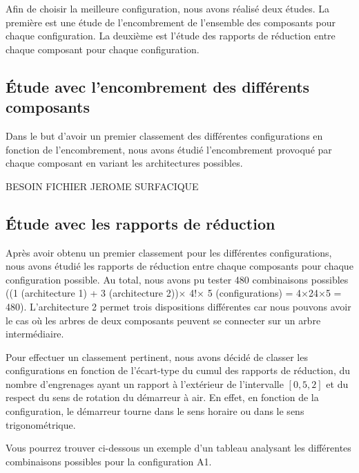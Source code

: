 \documentclass{config}
\begin{document}
\begin{spacing}{1.2}
Afin de choisir la meilleure configuration, nous avons réalisé deux études. La première est une étude de l'encombrement de l'ensemble des composants pour chaque configuration. La deuxième est  l'étude des rapports de réduction entre chaque composant pour chaque configuration.

\newpage
\subsection{Étude avec l'encombrement des différents composants}
Dans le but d'avoir un premier classement des différentes configurations en fonction de l'encombrement, nous avons étudié l'encombrement provoqué par chaque composant en variant les architectures possibles. 

BESOIN FICHIER JEROME SURFACIQUE

\newpage
\subsection{Étude avec les rapports de réduction}

Après avoir obtenu un premier classement pour les différentes configurations, nous avons étudié les rapports de réduction entre chaque composants pour chaque configuration possible. Au total, nous avons pu tester 480 combinaisons possibles ((1 (architecture 1) + 3 (architecture 2))$\times$ 4!$\times$ 5 (configurations) = 4$\times$24$\times$5 = 480). L'architecture 2 permet trois dispositions différentes car nous pouvons avoir le cas où les arbres de deux composants peuvent se connecter sur un arbre intermédiaire.

Pour effectuer un classement pertinent, nous avons décidé de classer les configurations en fonction de l'écart-type du cumul des rapports de réduction, du nombre d'engrenages ayant un rapport à l'extérieur de l'intervalle $[0,5,2]$ et du respect du sens de rotation du démarreur à air. En effet, en fonction de la configuration, le démarreur tourne dans le sens horaire ou dans le sens trigonométrique.

Vous pourrez trouver ci-dessous un exemple d'un tableau analysant les différentes combinaisons possibles pour la configuration A1.


\end{spacing}
\end{document}
